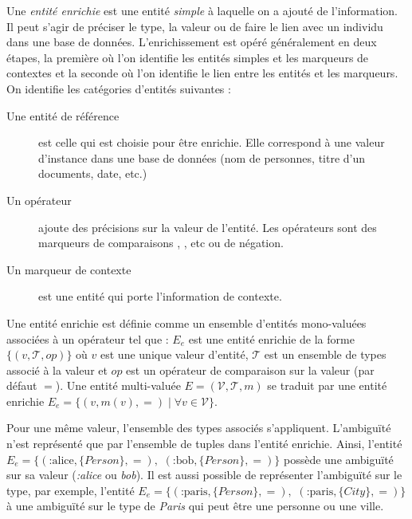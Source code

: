Une \emph{entité enrichie} est une entité \emph{simple} à laquelle on a ajouté de l'information.
Il peut s'agir de préciser le type, la valeur ou de faire le lien avec un individu dans une base de données.
L'enrichissement est opéré généralement en deux étapes, la première où l'on identifie les entités simples et les marqueurs de contextes et la seconde où l'on identifie le lien entre les entités et les marqueurs.
On identifie les catégories d'entités suivantes :
\begin{description}
    \item[Une entité de référence] est celle qui est choisie pour être enrichie.
          Elle correspond à une valeur d'instance dans une base de données (nom de personnes, titre d'un documents, date, etc.)
    \item[Un opérateur] ajoute des précisions sur la valeur de l'entité.
          Les opérateurs sont des marqueurs de comparaisons , , etc ou de négation.
    \item[Un marqueur de contexte] est une entité qui porte l'information de contexte.
\end{description}

\begin{definition}
      Une entité enrichie est définie comme un ensemble d'entités mono-valuées associées à un opérateur tel que :
      $E_e$ est une entité enrichie de la forme $\{(v, \mathcal{T}, op)\}$ où $v$ est une unique valeur d'entité, $\mathcal{T}$ est un ensemble de types associé à la valeur et $op$ est un opérateur de comparaison sur la valeur (par défaut $=$).
      Une entité multi-valuée $E = (\mathcal{V}, \mathcal{T}, m)$ se traduit par une entité enrichie $E_e = \{(v, m(v), =) \mid \forall v \in \mathcal{V}\}$.
\end{definition}

Pour une même valeur, l'ensemble des types associés s'appliquent.
L'ambiguïté n'est représenté que par l'ensemble de tuples dans l'entité enrichie.
Ainsi, l'entité $E_e = \{ (\text{:alice}, \{Person\}, =),$ $(\text{:bob}, \{Person\}, =) \}$ possède une ambiguïté sur sa valeur (\emph{:alice} ou \emph{bob}).
Il est aussi possible de représenter l'ambiguïté sur le type, par exemple, l'entité $E_e = \{ (\text{:paris}, \{Person\}, =),$ $(\text{:paris}, \{City\}, =) \}$ à une ambiguïté sur le type de \emph{Paris} qui peut être une personne ou une ville.

